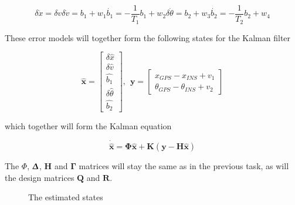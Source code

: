 \documentclass{article}
\begin{document}
\begin{subequations}
\begin{equation}
	\delta\dot{x} = \delta v
\end{equation}
\begin{equation}
	\delta\dot{v} = b_1 + w_1
\end{equation}
\begin{equation}
	\dot{b_1} = -\frac{1}{T_1}b_1 + w_2
\end{equation}
\begin{equation}
	\delta\dot{\theta} = b_2 + w_3
\end{equation}
\begin{equation}
	\dot{b_2} = -\frac{1}{T_2}b_2 + w_4
\end{equation}
\end{subequations}

These error models will together form the following states for the Kalman filter

\begin{equation}
	\hat{\bm{x}} =
	\begin{bmatrix}
		\delta\hat{x} \\ \delta\hat{v} \\ \hat{b_1} \\ \delta\hat{\theta} \\ \hat{b_2}
	\end{bmatrix}
	, \hspace{5pt}
	\bm{y} = 
	\begin{bmatrix}
		x_{GPS} - x_{INS} + v_1 \\
		\theta_{GPS} - \theta_{INS} + v_2
	\end{bmatrix}
\end{equation}

which together will form the Kalman equation

\begin{equation}
	\dot{\hat{\bm{x}}} = \bm{\Phi}\hat{\bm{x}} + \bm{K}(\bm{y} - \bm{H}\hat{\bm{x}})
\end{equation}

The $\Phi$, $\bm{\Updelta}$, $\bm{H}$ and $\bm{\Gamma}$ matrices will stay the same as in the previous task, as will the design matrices $\bm{Q}$ and $\bm{R}$.
	
\begin{figure}[!ht]
    \centering
    \caption{The estimated states}
\end{figure}
\end{document}
